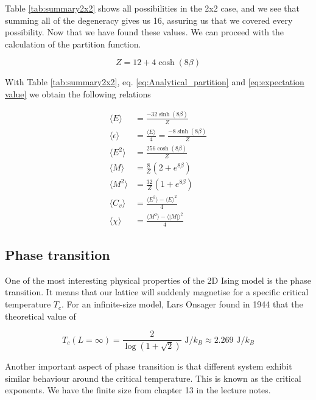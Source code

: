 \documentclass[english,notitlepage,reprint,nofootinbib]{revtex4-2}  %
\begin{document}
	Table \ref{tab:summary2x2} shows all possibilities in the 2x2 case, and we see that summing all
	of the degeneracy gives us 16, assuring us that we covered every possibility. Now that
	we have found these values. We can proceed with the calculation of the partition function.

	\begin{equation}
		Z = 12 + 4\cosh(8\beta) \label{eq:Analytical_partition}
	\end{equation}


	With Table \ref{tab:summary2x2}, eq. \ref{eq:Analytical_partition} and \ref{eq:expectation value} we obtain the following relations

	\begin{align*} \label{eq:sol}
		\langle E \rangle &= \frac{-32\sinh(8\beta)}{Z}  \\
		\langle \epsilon \rangle &= \frac{\langle E \rangle}{4} = \frac{-8\sinh(8\beta)}{Z} \\
		\langle E^2 \rangle &= \frac{256 \cosh(8\beta)}{Z} \\
		\langle M \rangle &= \frac{8}{Z} (2 + e^{8\beta}) \\
		\langle M^2 \rangle &= \frac{32}{Z} (1 + e^{8\beta}) \\
		\langle C_v \rangle &= \frac{\langle E^2 \rangle - \langle E \rangle^2}{4} \\
		\langle \chi \rangle &=  \frac{\langle M^2 \rangle - \langle |M| \rangle^2}{4}
	\end{align*}


	\subsection{Phase transition}\label{subsec:phase transition}
	One of the most interesting physical properties of the 2D Ising model is the phase transition.
	It means that our lattice will suddenly magnetise for a specific critical temperature $T_c$. For an infinite-size model, Lars Onsager found in 1944 that the theoretical value of

	\begin{equation}
		T_c(L=\infty)=\frac{2}{\log(1 + \sqrt{2})} \text{ J}/k_{B} \approx 2.269 \text{ J}/k_{B} \label{Tc_theo}
	\end{equation}

	Another important aspect of phase transition is that different system exhibit similar
	behaviour around the critical temperature. This is known as the critical exponents. We have the finite size from chapter 13 in the lecture notes\cite{Morten15}.
\end{document}
